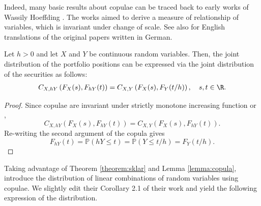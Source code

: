 Indeed, many basic results about copulae can be traced back to early
works of Wassily Hoeffding \citep{hoedffding1940, hoedffding1941}. 
The works aimed to derive a measure of relationship of variables,
which is invariant under change of scale. 
See also \citet{hoeffding2012collected} for English translations of
the original papers written in German. 

\begin{lemma}
  \label{lemma:copula}
  Let $h>0$ and let $X$ and $Y$ be continuous random variables. Then,
  the joint distribution of the portfolio positions 
  can be expressed via the joint distribution of the securities as
  follows:
  \begin{align}
  C_{X, hY}\left(F_X(s),F_{hY}(t)\right) = C_{X,
    Y}\left(F_X(s),F_{Y}(t/h)\right), \quad s,t\in \R.
    \end{align}
  \end{lemma}

\begin{proof}
  Since copulae are invariant under strictly monotone increasing
  function \citet[Theorem 3 (i)]{schweizer1981nonparametric} or
  \citet[Theorem 2.4.3]{Nelsen1999}, 
  \begin{equation*}
    C_{X, hY}\left(F_X(s),F_{hY}(t)\right) = C_{X, Y}\left(F_X(s),F_{hY}(t)\right).
    \end{equation*}
Re-writing the second argument of the copula gives
\begin{equation*}
  F_{hY}(t) = \mathbb{P}(hY \leq t)
  = \mathbb{P}(Y \leq t/h)
  = F_Y(t/h).
\end{equation*}
\end{proof}

Taking advantage of Theorem \ref{theorem:sklar} and Lemma \ref{lemma:copula}, \citet{barbi2014copula}
introduce the distribution of linear combinations of random variables
using copulae. 
We slightly edit their Corollary 2.1 of their work and yield the 
following expression of the distribution. 

